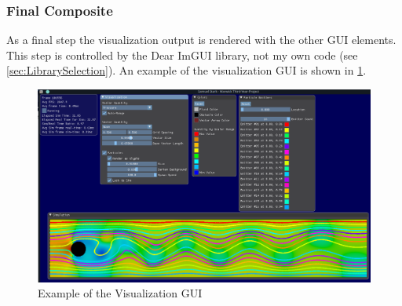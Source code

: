 \subsubsection{Final Composite}
As a final step the visualization output is rendered with the other GUI elements.
This step is controlled by the Dear ImGUI library, not my own code (see \cref{sec:LibrarySelection}).
An example of the visualization GUI is shown in \cref{fig:viz_gui}.

\begin{figure}[b]
    \centering
    \includegraphics[width=\linewidth]{Ch42Design/figures/dan.png}
    \caption{Example of the Visualization GUI}
    \label{fig:viz_gui}
\end{figure}
